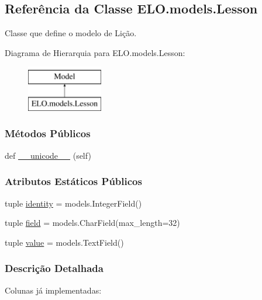 \hypertarget{classELO_1_1models_1_1Lesson}{}\subsection{Referência da Classe E\+L\+O.\+models.\+Lesson}
\label{classELO_1_1models_1_1Lesson}


Classe que define o modelo de Lição.  


Diagrama de Hierarquia para E\+L\+O.\+models.\+Lesson\+:\begin{figure}[H]
\begin{center}
\leavevmode
\includegraphics[height=2.000000cm]{d0/da3/classELO_1_1models_1_1Lesson}
\end{center}
\end{figure}
\subsubsection*{Métodos Públicos}
\begin{DoxyCompactItemize}
\item 
def \hyperlink{classELO_1_1models_1_1Lesson_a53e265de97c6b73f262f62a80f9ca994}{\+\_\+\+\_\+unicode\+\_\+\+\_\+} (self)
\end{DoxyCompactItemize}
\subsubsection*{Atributos Estáticos Públicos}
\begin{DoxyCompactItemize}
\item 
tuple \hyperlink{classELO_1_1models_1_1Lesson_aa650c6add387eee9e15421717074c0d3}{identity} = models.\+Integer\+Field()
\item 
tuple \hyperlink{classELO_1_1models_1_1Lesson_a1657c9c36e8d9c58d86c272e2339e7b1}{field} = models.\+Char\+Field(max\+\_\+length=32)
\item 
tuple \hyperlink{classELO_1_1models_1_1Lesson_a27927b9763fb13a9e41b3f826439c600}{value} = models.\+Text\+Field()
\end{DoxyCompactItemize}


\subsubsection{Descrição Detalhada}
Colunas já implementadas\+:

